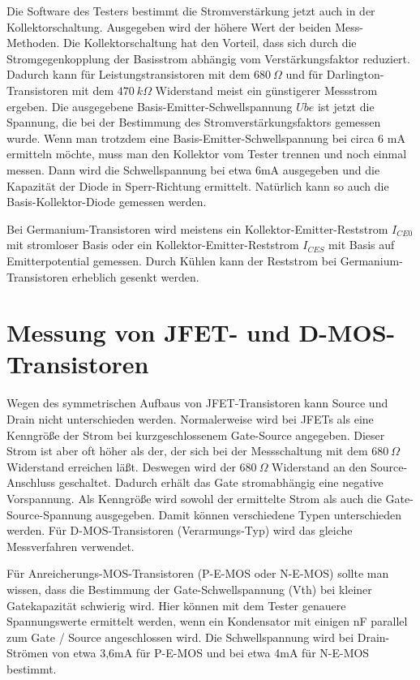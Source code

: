 Die Software des Testers bestimmt die Stromverstärkung jetzt auch in der Kollektorschaltung.
Ausgegeben wird der höhere Wert der beiden Mess-Methoden.
Die Kollektorschaltung hat den Vorteil, dass sich durch die Stromgegenkopplung der Basisstrom abhängig vom
Verstärkungsfaktor reduziert. Dadurch kann für Leistungstransistoren mit dem \(680~\Omega\) und für Darlington-Transistoren
mit dem \(470~k\Omega\) Widerstand meist ein günstigerer Messstrom ergeben.
Die ausgegebene Basis-Emitter-Schwellspannung \(Ube\) ist jetzt die Spannung,
die bei der Bestimmung des Stromverstärkungsfaktors gemessen wurde.
Wenn man trotzdem eine Basis-Emitter-Schwellspannung bei circa 6 mA ermitteln möchte, muss man den Kollektor
vom Tester trennen und noch einmal messen.
Dann wird die Schwellspannung bei etwa 6mA ausgegeben und die Kapazität der Diode in Sperr-Richtung ermittelt.
Natürlich kann so auch die Basis-Kollektor-Diode gemessen werden.

Bei Germanium-Transistoren wird meistens ein Kollektor-Emitter-Reststrom \(I_{CE0}\) mit stromloser Basis oder
ein Kollektor-Emitter-Reststrom \(I_{CES}\) mit Basis auf Emitterpotential gemessen.
Durch Kühlen kann der Reststrom bei Germanium-Transistoren erheblich gesenkt werden. 

\section{Messung von JFET- und D-MOS-Transistoren}
Wegen des symmetrischen Aufbaus von JFET-Transistoren kann Source und Drain nicht unterschieden werden.
Normalerweise wird bei JFETs als eine Kenngröße der Strom bei kurzgeschlossenem Gate-Source angegeben.
Dieser Strom ist aber oft höher als der, der sich bei der Messschaltung mit dem \(680~\Omega\) Widerstand erreichen läßt.
Deswegen wird der \(680~\Omega\) Widerstand an den Source-Anschluss geschaltet. Dadurch erhält das Gate
stromabhängig eine negative Vorspannung. Als Kenngröße wird sowohl der ermittelte Strom als auch die
Gate-Source-Spannung ausgegeben. 
Damit können verschiedene Typen unterschieden werden.
Für D-MOS-Transistoren (Verarmungs-Typ) wird das gleiche Messverfahren verwendet.

Für Anreicherungs-MOS-Transistoren (P-E-MOS oder N-E-MOS) sollte man wissen, dass die Bestimmung der Gate-Schwellspannung (Vth)
bei kleiner Gatekapazität schwierig wird. Hier können mit dem Tester genauere Spannungswerte ermittelt werden, wenn ein
Kondensator mit einigen nF parallel zum Gate / Source angeschlossen wird.
Die Schwellspannung wird bei Drain-Strömen von etwa 3,6mA für P-E-MOS und bei etwa 4mA für N-E-MOS bestimmt.
